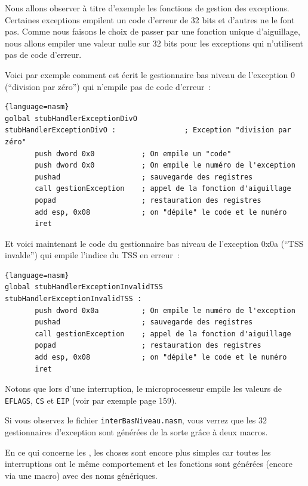\begin{itemize}
   Nous allons observer à titre d'exemple les fonctions de gestion des
exceptions. Certaines exceptions empilent un code d'erreur de 32 bits
et d'autres ne le font pas. Comme nous faisons le choix de passer par
une fonction unique d'aiguillage, nous allons empiler une valeur nulle
sur 32 bits pour les exceptions qui n'utilisent pas de code d'erreur.

   Voici par exemple comment est écrit le gestionnaire bas niveau de
l'exception 0 (``division par zéro'') qui n'empile pas de code
d'erreur~:

\begin{lstlisting}{language=nasm}
golbal stubHandlerExceptionDivO
stubHandlerExceptionDivO :                ; Exception "division par zéro"
       push dword 0x0           ; On empile un "code"
       push dword 0x0           ; On empile le numéro de l'exception
       pushad                   ; sauvegarde des registres
       call gestionException    ; appel de la fonction d'aiguillage
       popad                    ; restauration des registres
       add esp, 0x08            ; on "dépile" le code et le numéro
       iret
\end{lstlisting}

   Et voici maintenant le code du gestionnaire bas niveau de
l'exception 0x0a (``TSS invalde'') qui empile l'indice du TSS en
erreur~:

\begin{lstlisting}{language=nasm}
global stubHandlerExceptionInvalidTSS
stubHandlerExceptionInvalidTSS :
       push dword 0x0a          ; On empile le numéro de l'exception
       pushad                   ; sauvegarde des registres
       call gestionException    ; appel de la fonction d'aiguillage
       popad                    ; restauration des registres
       add esp, 0x08            ; on "dépile" le code et le numéro
       iret
\end{lstlisting}

   Notons que lors d'une interruption, le microprocesseur empile les
valeurs de {\tt EFLAGS}, {\tt CS} et {\tt EIP} (voir par exemple
\cite{intel386pru1986} page 159).

   Si vous observez le fichier \lstinline!interBasNiveau.nasm!, vous
verrez que les 32 gestionnaires d'exception sont générées de la sorte
grâce à deux macros.

   En ce qui concerne les \irq, les choses sont encore plus simples
car toutes les interruptions ont le même comportement et les fonctions
sont générées (encore via une macro) avec des noms génériques.


\end{itemize}
